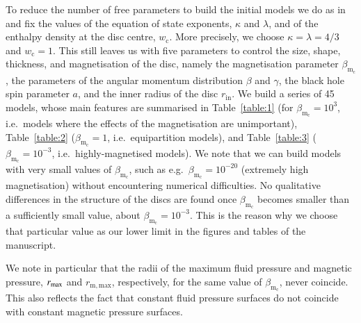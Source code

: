 \documentclass[referee]{aa}
\begin{document}
To reduce the number of free parameters to build the initial models we do as in~\citet{Komissarov:2006} and fix the values of the equation of state exponents, $\kappa$ and $\lambda$, and of the enthalpy density at the disc centre, $w_{\mathrm{c}}$. More precisely, we choose $\kappa = \lambda = 4/3$ and $w_{\mathrm{c}} = 1$. This still leaves us with five parameters to control the size, shape, thickness, and magnetisation of the disc, namely the magnetisation parameter $\beta_{\mathrm{m}_{\mathrm{c}}}$, the parameters of the angular momentum distribution $\beta$ and $\gamma$, the black hole spin parameter $a$, and the inner radius of the disc $r_{\mathrm{in}}$. We build a series of 45 models, whose main features are summarised in Table~\ref{table:1} (for $\beta_{\mathrm{m}_{\mathrm{c}}} = 10^{3}$, i.e.~models where the effects of the magnetisation are unimportant), Table~\ref{table:2} ($\beta_{\mathrm{m}_{\mathrm{c}}} = 1$, i.e.~equipartition models), and Table~\ref{table:3} ($\beta_{\mathrm{m}_{\mathrm{c}}} = 10^{-3}$, i.e.~highly-magnetised models). We note that we can build models with very small values of $\beta_{\mathrm{m}_{\mathrm{c}}}$, such as  e.g.~$\beta_{\mathrm{m}_{\mathrm{c}}} = 10^{-20}$ (extremely high magnetisation) without encountering numerical difficulties. No qualitative differences in the structure of the discs are found once $\beta_{\mathrm{m}_{\mathrm{c}}}$ becomes smaller than a sufficiently small value, about $\beta_{\mathrm{m}_{\mathrm{c}}}=10^{-3}$. This is the reason why we choose that particular value as our lower limit in the figures and tables of the manuscript.

We note in particular that the radii of the maximum fluid pressure and magnetic pressure, $r_{{\rm{max}}}$ and $r_{{\mathrm{m, max}}}$, respectively, for the same value of $\beta_{\mathrm{m}_{\mathrm{c}}}$, never coincide. This also reflects the fact that constant fluid pressure surfaces do not coincide with constant magnetic pressure surfaces.
\end{document}
